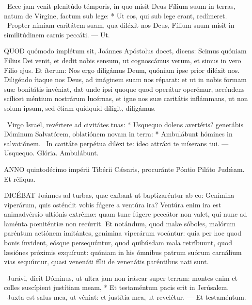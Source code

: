 \R\ Ecce jam venit plenitúdo témporis, in quo misit Deus Fílium suum in terras, natum de Vírgine, factum sub lege: * Ut eos, qui sub lege erant, redímeret. \V\ Propter nímiam caritátem suam, qua diléxit nos Deus, Fílium suum misit in similitúdinem carnis peccáti. --- Ut.


\lettrine[lines=2]{Q}{UOD} quómodo implétum sit, Joánnes Apóstolus docet, dicens: Scimus quóniam Fílius Dei venit, et dedit nobis sensum, ut cognoscámus verum, et simus in vero Fílio ejus. Et íterum: Nos ergo diligámus Deum, quóniam ipse prior diléxit nos. Diligéndo ítaque nos Deus, ad imáginem suam nos réparat: et ut in nobis formam suæ bonitátis invéniat, dat unde ipsi quoque quod operátur operémur, accéndens scílicet méntium nostrárum lucérnas, et igne nos suæ caritátis inflámmans, ut non solum ipsum, sed étiam quidquid díligit, diligámus.

\R\ Virgo Israël, revértere ad civitátes tuas: * Usquequo dolens avertéris? generábis Dóminum Salvatórem, oblatiónem novam in terra: * Ambulábunt hómines in salvatiónem. \V\ In caritáte perpétua diléxi te: ídeo attráxi te míserans tui. --- Usquequo. Glória. Ambulábunt.




\lettrine[lines=2]{A}{NNO} quintodécimo impérii Tibérii Cǽsaris, procuránte Póntio Piláto Judǽam. Et réliqua.



\lettrine[lines=2]{D}{ICÉBAT} Joánnes ad turbas, quæ exíbant ut baptizaréntur ab eo: Genímina viperárum, quis osténdit vobis fúgere a ventúra ira? Ventúra enim ira est animadvérsio ultiónis extrémæ: quam tunc fúgere peccátor non valet, qui nunc ad laménta pœniténtiæ non recúrrit. Et notándum, quod malæ sóboles, malórum paréntum actiónem imitántes, genímina viperárum vocántur: quia per hoc quod bonis ínvident, eósque persequúntur, quod quibúsdam mala retríbuunt, quod læsiónes próximis exquírunt: quóniam in his ómnibus patrum suórum carnálium vias sequúntur, quasi venenáti fílii de venenátis paréntibus nati sunt.

\R\ Jurávi, dicit Dóminus, ut ultra jam non iráscar super terram: montes enim et colles suscípient justítiam meam, * Et testaméntum pacis erit in Jerúsalem. \V\ Juxta est salus mea, ut véniat: et justítia mea, ut revelétur. --- Et testaméntum.

